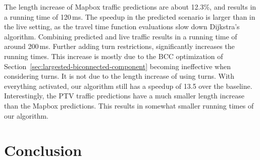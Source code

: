 \documentclass[manuscript,review]{acmart}
\begin{document}
The length increase of Mapbox traffic predictions are about 12.3\%, and results in a running time of 120\,ms.
The speedup in the predicted scenario is larger than in the live setting, as the travel time function evaluations slow down Dijkstra's algorithm.
Combining predicted and live traffic results in a running time of around 200\,ms.
Further adding turn restrictions, significantly increases the running times.
This increase is mostly due to the BCC optimization of Section~\ref{sec:largested-biconnected-component} becoming ineffective when considering turns.
It is not due to the length increase of using turns.
With everything activated, our algorithm still has a speedup of 13.5 over the baseline.
Interestingly, the PTV traffic predictions have a much smaller length increase than the Mapbox predictions.
This results in somewhat smaller running times of our algorithm.



\section{Conclusion}
\label{sec:conclusion}
\end{document}
